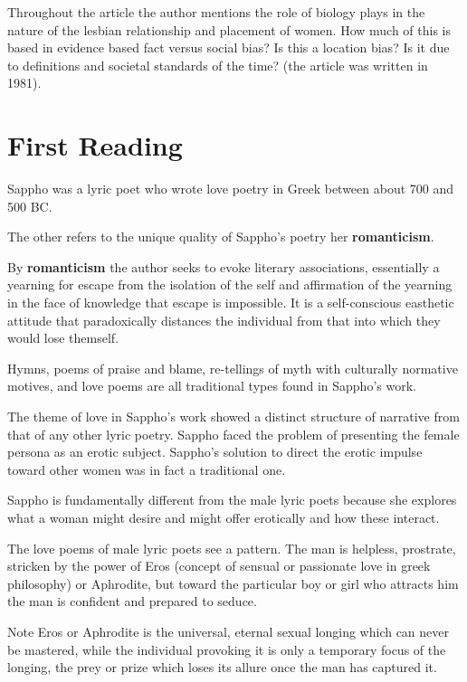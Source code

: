 \begin{rmk}
    Throughout the article the author mentions the role of biology plays in the nature of the lesbian relationship and placement of women. How much of this is based in evidence based fact versus social bias? Is this a location bias? Is it due to definitions and societal standards of the time? (the article was written in 1981).
\end{rmk}

\section{First Reading}
\label{sec:FirRead1}

\begin{rmk}
    Sappho was a lyric poet who wrote love poetry in Greek between about 700 and 500 BC. 
\end{rmk}

The other refers to the unique quality of Sappho's poetry her \textbf{romanticism}.

\begin{defn}
    By \textbf{romanticism} the author seeks to evoke literary associations, essentially a yearning for escape from the isolation of the self and affirmation of the yearning in the face of knowledge that escape is impossible. It is a self-conscious easthetic attitude that paradoxically distances the individual from that into which they would lose themself.
\end{defn}

\begin{rmk}
    Hymns, poems of praise and blame, re-tellings of myth with culturally normative motives, and love poems are all traditional types found in Sappho's work.
\end{rmk}

The theme of love in Sappho's work showed a distinct structure of narrative from that of any other lyric poetry. Sappho faced the problem of presenting the female persona as an erotic subject. Sappho's solution to direct the erotic impulse toward other women was in fact a traditional one.

Sappho is fundamentally different from the male lyric poets because she explores what a woman might desire and might offer erotically and how these interact.

\begin{nte}
    The love poems of male lyric poets see a pattern. The man is helpless, prostrate, stricken by the power of Eros (concept of sensual or passionate love in greek philosophy) or Aphrodite, but toward the particular boy or girl who attracts him the man is confident and prepared to seduce.

    Note Eros or Aphrodite is the universal, eternal sexual longing which can never be mastered, while the individual provoking it is only a temporary focus of the longing, the prey or prize which loses its allure once the man has captured it.
\end{nte}

